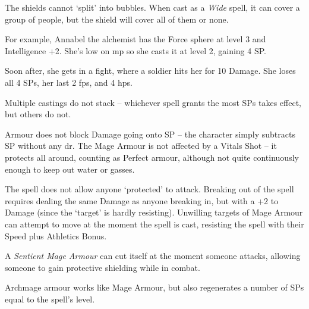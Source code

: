 \begin{multicols}{2}
The shields cannot `split' into bubbles.
When cast as a \textit{Wide} spell, it can cover a group of people, but the shield will cover all of them or none.

\begin{exampletext}
  For example, Annabel the alchemist has the Force sphere at level 3 and Intelligence +2.
  She's low on \gls{mp} so she casts it at level 2, gaining 4 \gls{SP}.
  
  Soon after, she gets in a fight, where a soldier hits her for 10 Damage.
  She loses all 4 \glspl{SP}, her last 2 \glspl{fp}, and 4 \glspl{hp}.
\end{exampletext}

Multiple castings do not stack -- whichever spell grants the most \glspl{SP} takes effect, but others do not.

Armour does not block Damage going onto \gls{SP} -- the character simply subtracts \gls{SP} without any \gls{dr}.
The Mage Armour is not affected by a Vitals Shot -- it protects all around, counting as Perfect armour, although not quite continuously enough to keep out water or gasses.

The spell does not allow anyone `protected' to attack.
Breaking out of the spell requires dealing the same Damage as anyone breaking in, but with a +2 to Damage (since the `target' is hardly resisting).
Unwilling targets of Mage Armour can attempt to move at the moment the spell is cast, resisting the spell with their Speed plus Athletics Bonus.

A \textit{Sentient Mage Armour} can cut itself at the moment someone attacks, allowing someone to gain protective shielding while in combat.

\spelllevel


Archmage armour works like Mage Armour, but also regenerates a number of \glspl{SP} equal to the spell's level.

\end{multicols}


